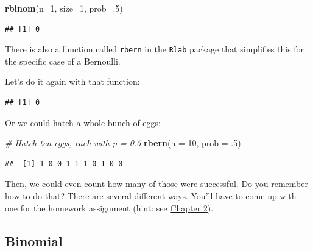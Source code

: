 \documentclass[
]{book}
\newenvironment{Shaded}{\begin{snugshade}}{\end{snugshade}}
\newcommand{\CommentTok}[1]{\textcolor[rgb]{0.56,0.35,0.01}{\textit{#1}}}
\newcommand{\DataTypeTok}[1]{\textcolor[rgb]{0.13,0.29,0.53}{#1}}
\newcommand{\DecValTok}[1]{\textcolor[rgb]{0.00,0.00,0.81}{#1}}
\newcommand{\FloatTok}[1]{\textcolor[rgb]{0.00,0.00,0.81}{#1}}
\newcommand{\KeywordTok}[1]{\textcolor[rgb]{0.13,0.29,0.53}{\textbf{#1}}}
\newcommand{\NormalTok}[1]{#1}
\begin{document}
\begin{Shaded}
\begin{Highlighting}[]
\KeywordTok{rbinom}\NormalTok{(}\DataTypeTok{n=}\DecValTok{1}\NormalTok{, }\DataTypeTok{size=}\DecValTok{1}\NormalTok{, }\DataTypeTok{prob=}\NormalTok{.}\DecValTok{5}\NormalTok{)}
\end{Highlighting}
\end{Shaded}

\begin{verbatim}
## [1] 0
\end{verbatim}

There is also a function called \texttt{rbern} in the \texttt{Rlab} package that simplifies this for the specific case of a Bernoulli.

Let's do it again with that function:

\begin{Shaded}
\end{Shaded}

\begin{verbatim}
## [1] 0
\end{verbatim}

Or we could hatch a whole bunch of eggs:

\begin{Shaded}
\begin{Highlighting}[]
\CommentTok{# Hatch ten eggs, each with p = 0.5}
\KeywordTok{rbern}\NormalTok{(}\DataTypeTok{n =} \DecValTok{10}\NormalTok{, }\DataTypeTok{prob =} \FloatTok{.5}\NormalTok{)}
\end{Highlighting}
\end{Shaded}

\begin{verbatim}
##  [1] 1 0 0 1 1 1 0 1 0 0
\end{verbatim}

Then, we could even count how many of those were successful. Do you remember how to do that? There are several different ways. You'll have to come up with one for the homework assignment (hint: see \protect\hyperlink{Chapter2}{Chapter 2}).

\hypertarget{binomial}{%
\subsection{Binomial}\label{binomial}}
\end{document}
